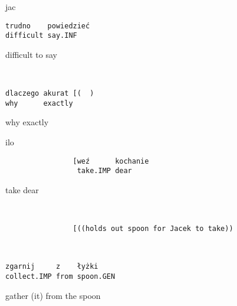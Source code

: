 \documentclass[output=paper]{langsci/langscibook}
\begin{document}
\vspace{2mm}
%
\begin{transbox}{1}{jac}
\begin{verbatim}
trudno    powiedzieć
difficult say.INF
\end{verbatim}
difficult to say
\end{transbox}
%
\begin{transbox}{2}{~}
\begin{verbatim}
dlaczego akurat [(  )
why      exactly
\end{verbatim}
why exactly
\end{transbox}
%
\begin{mdframednoverticalspace}[style=firstfoc]
\begin{transbox}{3}{ilo}
\begin{verbatim}
                [weź      kochanie
                 take.IMP dear
\end{verbatim}
\hspace{2.5cm}take dear
\end{transbox}
\end{mdframednoverticalspace}\vspace{1.5mm}
%
\begin{mdframednoverticalspace}[style=firstfoc]
\begin{transbox}{4}{~}
\begin{verbatim}
                [((holds out spoon for Jacek to take))
\end{verbatim}
\end{transbox}
\end{mdframednoverticalspace}
%
\begin{mdframednoverticalspace}[style=firstfoc]
\begin{transbox}{5}{~}
\begin{verbatim}
zgarnij     z    łyżki
collect.IMP from spoon.GEN
\end{verbatim}
gather (it) from the spoon
\end{transbox}
\end{mdframednoverticalspace}
%
\begin{mdframednoverticalspace}[style=secondfoc]
\end{mdframednoverticalspace}
\end{document}

